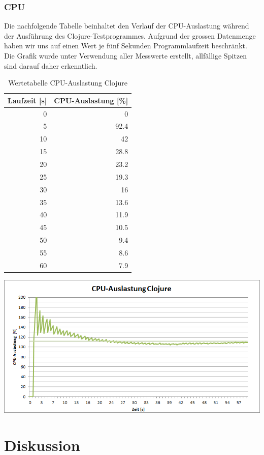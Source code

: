 \documentclass{fancydocument}
\begin{document}
\subsubsection{CPU}
Die nachfolgende Tabelle beinhaltet den Verlauf der CPU-Auslastung während der Ausführung des Clojure-Testprogrammes. Aufgrund der grossen Datenmenge haben wir uns auf einen Wert je fünf Sekunden Programmlaufzeit beschränkt. Die Grafik wurde unter Verwendung aller Messwerte erstellt, allfällige Spitzen sind darauf daher erkenntlich.
\begin{table}[h!]
\centering
\begin{tabular}{|r|r|} \hline
\textbf{Laufzeit [s]} & \textbf{CPU-Auslastung [\%]}\\
\hline
0 & 0\\
\hline
5 & 92.4\\
\hline
10 & 42\\
\hline
15 & 28.8\\
\hline
20 & 23.2\\
\hline
25 & 19.3\\
\hline
30 & 16\\
\hline
35 & 13.6\\
\hline
40 & 11.9\\
\hline
45 & 10.5\\
\hline
50 & 9.4\\
\hline
55 & 8.6\\
\hline
60 & 7.9\\
\hline
\end{tabular}
\caption{Wertetabelle CPU-Auslastung Clojure}
\end{table}
\begin{center}
\includegraphics[width=\linewidth]{bilder/CPUClojure.png}
\end{center}

\section{Diskussion}
\end{document}
